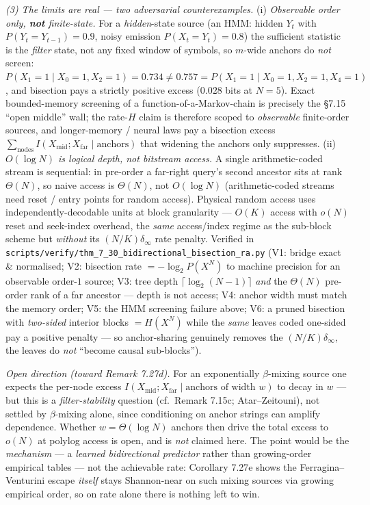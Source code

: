 \documentclass[
]{article}
\begin{document}
\emph{(3) The limits are real --- two adversarial counterexamples.} (i) \emph{Observable
order only, \textbf{not} finite-state.} For a \emph{hidden}-state source (an HMM: hidden
$Y_t$ with $P(Y_t{=}Y_{t-1}){=}0.9$, noisy emission $P(X_t{=}Y_t){=}0.8$) the sufficient
statistic is the \emph{filter} state, not any fixed window of symbols, so $m$-wide anchors
do \emph{not} screen: $P(X_1{=}1\mid X_0{=}1,X_2{=}1)=0.734\neq0.757=P(X_1{=}1\mid
X_0{=}1,X_2{=}1,X_4{=}1)$, and bisection pays a strictly positive excess ($0.028$ bits at
$N{=}5$). Exact bounded-memory screening of a function-of-a-Markov-chain is precisely the
§7.15 ``open middle'' wall; the rate-$H$ claim is therefore scoped to \emph{observable}
finite-order sources, and longer-memory / neural laws pay a bisection excess
$\sum_{\text{nodes}}I(X_{\text{mid}};X_{\text{far}}\mid\text{anchors})$ that widening the
anchors only suppresses. (ii) \emph{$O(\log N)$ is logical depth, not bitstream access.} A
single arithmetic-coded stream is sequential: in pre-order a far-right query's second
ancestor sits at rank $\Theta(N)$, so naive access is $\Theta(N)$, not $O(\log N)$
(arithmetic-coded streams need reset / entry points for random access). Physical random
access uses independently-decodable units at block granularity --- $O(K)$ access with
$o(N)$ reset and seek-index overhead, the \emph{same} access/index regime as the sub-block
scheme but \emph{without} its $(N/K)\delta_\infty$ rate penalty. Verified in
\texttt{scripts/verify/thm\_7\_30\_bidirectional\_bisection\_ra.py} (V1: bridge exact \&
normalised; V2: bisection rate $=-\log_2 P(X^N)$ to machine precision for an observable
order-$1$ source; V3: tree depth $\lceil\log_2(N-1)\rceil$ \emph{and} the $\Theta(N)$
pre-order rank of a far ancestor --- depth is not access; V4: anchor width must match the
memory order; V5: the HMM screening failure above; V6: a pruned bisection with
\emph{two-sided} interior blocks $=H(X^N)$ while the \emph{same} leaves coded one-sided
pay a positive penalty --- so anchor-sharing genuinely removes the $(N/K)\delta_\infty$,
the leaves do \emph{not} ``become causal sub-blocks'').

\emph{Open direction (toward Remark 7.27d).} For an exponentially $\beta$-mixing source one
expects the per-node excess $I(X_{\text{mid}};X_{\text{far}}\mid\text{anchors of width }w)$
to decay in $w$ --- but this is a \emph{filter-stability} question (cf.\ Remark 7.15c;
Atar--Zeitouni), not settled by $\beta$-mixing alone, since conditioning on anchor strings
can amplify dependence. Whether $w=\Theta(\log N)$ anchors then drive the total excess to
$o(N)$ at polylog access is open, and is \emph{not} claimed here. The point would be the
\emph{mechanism} --- a \emph{learned bidirectional predictor} rather than growing-order
empirical tables --- not the achievable rate: Corollary 7.27e shows the
Ferragina--Venturini escape \emph{itself} stays Shannon-near on such mixing sources via
growing empirical order, so on rate alone there is nothing left to win.
\end{document}
